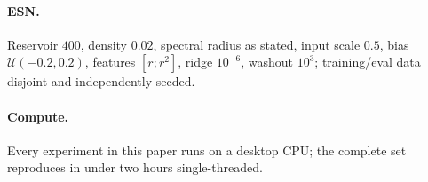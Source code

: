 \documentclass[11pt]{article}
\begin{document}
\paragraph{ESN.} Reservoir $400$, density $0.02$, spectral radius as stated, input
scale $0.5$, bias $\mathcal U(-0.2,0.2)$, features $[r;r^2]$, ridge $10^{-6}$, washout
$10^3$; training/eval data disjoint and independently seeded.

\paragraph{Compute.} Every experiment in this paper runs on a desktop CPU; the complete
set reproduces in under two hours single-threaded.
\end{document}
